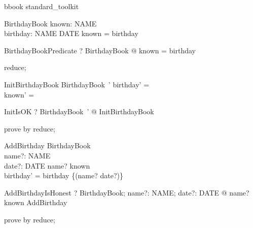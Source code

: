 
\begin{zsection}
   \SECTION  bbook \parents standard\_toolkit
\end{zsection}

\begin{zed}
\end{zed}

\begin{schema}{BirthdayBook}
  known: \power NAME \\
  birthday: NAME \pfun DATE
\where
  known = \dom  birthday
\end{schema}

\begin{theorem}{BirthdayBookPredicate}
\vdash? \forall BirthdayBook @ known = \dom birthday
\end{theorem}

\begin{zproof}[BirthdayBookPredicate]
reduce;
\end{zproof}

\begin{schema}{InitBirthdayBook}
  BirthdayBook~'
\where
  birthday' = \emptyset\\
  known' = \emptyset
\end{schema}

\begin{theorem}{InitIsOK}
\vdash? \exists  BirthdayBook~' @ InitBirthdayBook
\end{theorem}

\begin{zproof}[InitIsOK]
prove by reduce;
\end{zproof}

\begin{schema}{AddBirthday}
  \Delta BirthdayBook\\
  name?: NAME\\
  date?: DATE
\where
  name? \notin  known\\
  birthday' = birthday \cup  \{(name? \mapsto  date?)\}
\end{schema}

\begin{theorem}{AddBirthdayIsHonest}
\vdash? \forall  BirthdayBook; name?: NAME; date?: DATE @ name? \notin  known \implies  \pre  AddBirthday
\end{theorem}

\begin{zproof}[AddBirthdayIsHonest]
prove by reduce;
\end{zproof}

